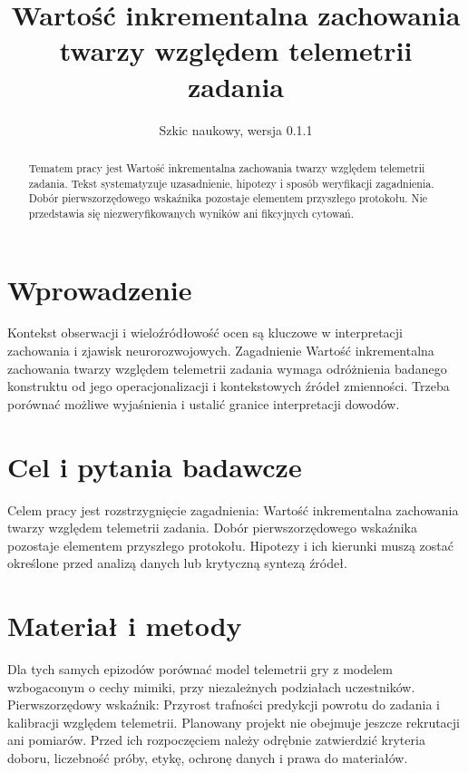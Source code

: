 \documentclass[11pt,a4paper]{article}
\title{Wartość inkrementalna zachowania twarzy względem telemetrii zadania}
\author{}
\date{Szkic naukowy, wersja 0.1.1}
\begin{document}
\maketitle

\begin{abstract}

Tematem pracy jest Wartość inkrementalna zachowania twarzy względem telemetrii zadania. Tekst systematyzuje uzasadnienie, hipotezy i sposób weryfikacji zagadnienia. Dobór pierwszorzędowego wskaźnika pozostaje elementem przyszłego protokołu. Nie przedstawia się niezweryfikowanych wyników ani fikcyjnych cytowań.

\end{abstract}

\section{Wprowadzenie}

Kontekst obserwacji i wieloźródłowość ocen są kluczowe w interpretacji zachowania i zjawisk neurorozwojowych. Zagadnienie Wartość inkrementalna zachowania twarzy względem telemetrii zadania wymaga odróżnienia badanego konstruktu od jego operacjonalizacji i kontekstowych źródeł zmienności. Trzeba porównać możliwe wyjaśnienia i ustalić granice interpretacji dowodów.

\section{Cel i pytania badawcze}

Celem pracy jest rozstrzygnięcie zagadnienia: Wartość inkrementalna zachowania twarzy względem telemetrii zadania. Dobór pierwszorzędowego wskaźnika pozostaje elementem przyszłego protokołu. Hipotezy i ich kierunki muszą zostać określone przed analizą danych lub krytyczną syntezą źródeł.

\section{Materiał i metody}

Dla tych samych epizodów porównać model telemetrii gry z modelem wzbogaconym o cechy mimiki, przy niezależnych podziałach uczestników. Pierwszorzędowy wskaźnik: Przyrost trafności predykcji powrotu do zadania i kalibracji względem telemetrii. Planowany projekt nie obejmuje jeszcze rekrutacji ani pomiarów. Przed ich rozpoczęciem należy odrębnie zatwierdzić kryteria doboru, liczebność próby, etykę, ochronę danych i prawa do materiałów.
\end{document}
